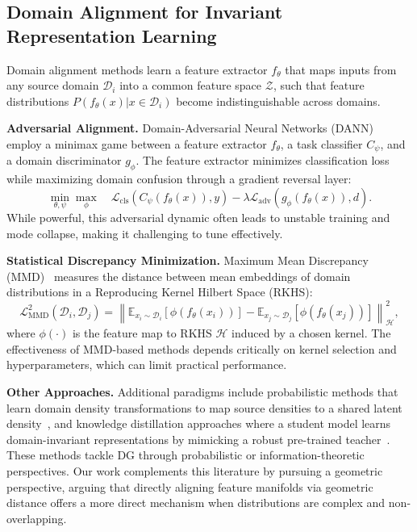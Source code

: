 \subsection{Domain Alignment for Invariant Representation Learning}

Domain alignment methods learn a feature extractor $f_\theta$ that maps inputs from any source domain $\mathcal{D}_i$ into a common feature space $\mathcal{Z}$, such that feature distributions $P(f_\theta(x) | x \in \mathcal{D}_i)$ become indistinguishable across domains.

\begin{sloppypar} 
\textbf{Adversarial Alignment.} Domain-Adversarial Neural Networks (DANN)~\citep{ganin2016domain} employ a minimax game between a feature extractor $f_\theta$, a task classifier $C_\psi$, and a domain discriminator $g_\phi$. The feature extractor minimizes classification loss while maximizing domain confusion through a gradient reversal layer:
\begin{equation}
    \min_{\theta, \psi} \max_{\phi} \quad \mathcal{L}_{\text{cls}}(C_\psi(f_\theta(x)), y) - \lambda \mathcal{L}_{\text{adv}}(g_\phi(f_\theta(x)), d).
\end{equation}
While powerful, this adversarial dynamic often leads to unstable training and mode collapse, making it challenging to tune effectively.
\end{sloppypar} 

\textbf{Statistical Discrepancy Minimization.} Maximum Mean Discrepancy (MMD)~\citep{gretton2012kernel, li2018domain_mmd} measures the distance between mean embeddings of domain distributions in a Reproducing Kernel Hilbert Space (RKHS):
\begin{equation}
    \mathcal{L}_{\text{MMD}}^2(\mathcal{D}_i, \mathcal{D}_j) = \left\| \mathbb{E}_{x_i \sim \mathcal{D}_i}[\phi(f_\theta(x_i))] - \mathbb{E}_{x_j \sim \mathcal{D}_j}[\phi(f_\theta(x_j))] \right\|_{\mathcal{H}}^2,
\end{equation}
where $\phi(\cdot)$ is the feature map to RKHS $\mathcal{H}$ induced by a chosen kernel. The effectiveness of MMD-based methods depends critically on kernel selection and hyperparameters, which can limit practical performance.

\textbf{Other Approaches.} Additional paradigms include probabilistic methods that learn domain density transformations to map source densities to a shared latent density~\citep{gong2016domain}, and knowledge distillation approaches where a student model learns domain-invariant representations by mimicking a robust pre-trained teacher~\citep{niu2024knowledge}. These methods tackle DG through probabilistic or information-theoretic perspectives. Our work complements this literature by pursuing a geometric perspective, arguing that directly aligning feature manifolds via geometric distance offers a more direct mechanism when distributions are complex and non-overlapping.

